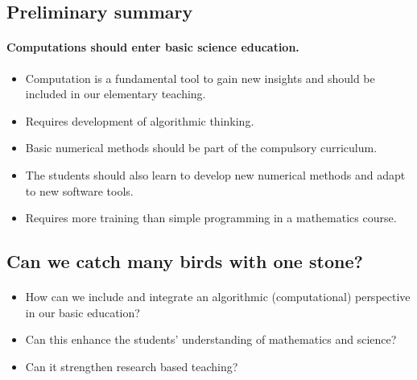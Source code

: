 \documentclass[%
twoside,                 %
final,                   %
10pt]{article}
\begin{document}
\subsection{Preliminary summary}

\paragraph{Computations should enter basic science education.}

\begin{itemize}
\item Computation is a fundamental tool to gain new insights and should be included in our elementary teaching.

\item Requires development of algorithmic thinking.

\item Basic numerical methods should be part of the compulsory curriculum.

\item The students should also learn to develop new numerical methods and adapt to new software tools.

\item Requires more training than simple programming in a mathematics course.
\end{itemize}

\noindent




\subsection{Can we catch many birds with one stone?}

\paragraph{}
\begin{itemize}
\item How can we include and integrate an algorithmic (computational) perspective   in our basic education?

\item Can this enhance the students' understanding of mathematics and science?

\item Can it strengthen research based teaching?
\end{itemize}
\end{document}
